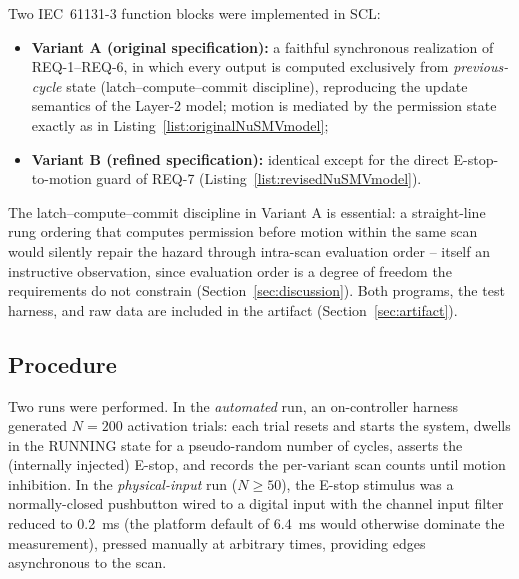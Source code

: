 \documentclass{ieeeaccess}
\theoremstyle{definition}
\begin{document}
Two IEC~61131-3 function blocks were implemented in SCL:
\begin{itemize}
\item \textbf{Variant A (original specification):} a faithful synchronous realization of REQ-1--REQ-6, in which every output is computed exclusively from \emph{previous-cycle} state (latch--compute--commit discipline), reproducing the update semantics of the Layer-2 model; motion is mediated by the permission state exactly as in Listing~\ref{list:originalNuSMVmodel};
\item \textbf{Variant B (refined specification):} identical except for the direct E-stop-to-motion guard of REQ-7 (Listing~\ref{list:revisedNuSMVmodel}).
\end{itemize}
The latch--compute--commit discipline in Variant A is essential: a straight-line rung ordering that computes permission before motion within the same scan would silently repair the hazard through intra-scan evaluation order -- itself an instructive observation, since evaluation order is a degree of freedom the requirements do not constrain (Section~\ref{sec:discussion}). Both programs, the test harness, and raw data are included in the artifact (Section~\ref{sec:artifact}).

\subsection{Procedure}
Two runs were performed. In the \emph{automated} run, an on-controller harness generated $N = 200$ activation trials: each trial resets and starts the system, dwells in the RUNNING state for a pseudo-random number of cycles, asserts the (internally injected) E-stop, and records the per-variant scan counts until motion inhibition. In the \emph{physical-input} run ($N \geq 50$), the E-stop stimulus was a normally-closed pushbutton wired to a digital input with the channel input filter reduced to 0.2~ms (the platform default of 6.4~ms would otherwise dominate the measurement), pressed manually at arbitrary times, providing edges asynchronous to the scan.
\end{document}
